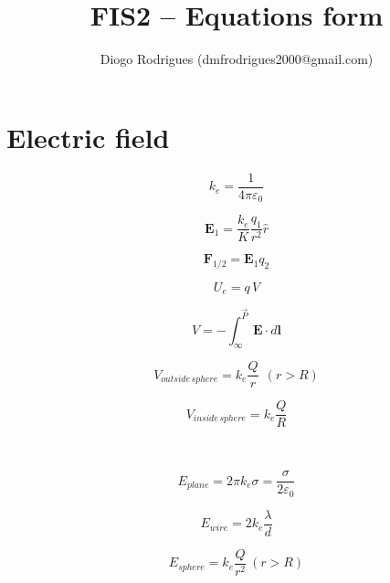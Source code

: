 \documentclass{form}
\author{Diogo Rodrigues (dmfrodrigues2000@gmail.com)}
\title{FIS2 -- Equations form}
\begin{document}
\begin{minipage}[c]{0.25\textwidth}
	\section*{Electric field}
\end{minipage}
\begin{minipage}[c]{0.15\textwidth}
	\begin{equation*}
		k_e = \frac{1}{4\pi\varepsilon_0}
	\end{equation*}
\end{minipage}
\begin{minipage}[c]{0.15\textwidth}
	\begin{equation*}
		\mathbf{E}_1 = \frac{k_e}{K}\frac{q_1}{r^2}\hat{r}
	\end{equation*}
\end{minipage}
\begin{minipage}[c]{0.15\textwidth}
	\begin{equation*}
		\mathbf{F}_{1/2} = \mathbf{E}_1 q_2
	\end{equation*}
\end{minipage}
\begin{center}
\begin{minipage}[c]{0.10\textwidth}
	\begin{equation*}
		U_e=q\,V
	\end{equation*}
\end{minipage}
\begin{minipage}[c]{0.15\textwidth}
	\begin{equation*}
		V=-\int_{\infty}^{\vec{P}}{\mathbf{E}\cdot d\mathbf{l}}
	\end{equation*}
\end{minipage}
\begin{minipage}[c]{0.25\textwidth}
	\begin{equation*}
		V_{outside\,sphere} = k_e \frac{Q}{r}~~(r>R)
	\end{equation*}
\end{minipage}
\begin{minipage}[c]{0.20\textwidth}
	\begin{equation*}
		V_{inside\,sphere} = k_e \frac{Q}{R}
	\end{equation*}
\end{minipage}
\\
\begin{minipage}[c]{0.20\textwidth}
	\begin{equation*}
		E_{plane}=2\pi k_e \sigma=\frac{\sigma}{2 \varepsilon_0}
	\end{equation*}
\end{minipage}
\begin{minipage}[c]{0.20\textwidth}
	\begin{equation*}
		E_{wire}=2 k_e \frac{\lambda}{d}
	\end{equation*}
\end{minipage}
\begin{minipage}[c]{0.25\textwidth}
	\begin{equation*}
		E_{sphere}=k_e \frac{Q}{r^2}~(r>R)
	\end{equation*}
\end{minipage}
\end{center}
\end{document}
